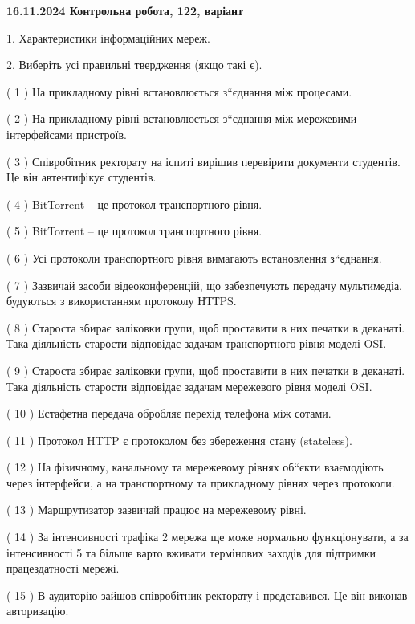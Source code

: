 \documentclass[12pt, ukrainian]{article}
\begin{document}
\vspace{4mm}
\newpage
\begin {large}

\textbf{16.11.2024 Контрольна робота, 122, варіант  }\par


{
1. Характеристики інформаційних мереж.



\vspace{5mm}
2. Виберіть усі правильні твердження (якщо такі є).\par
\vspace{2mm}

( 1 ) На прикладному рівні встановлюється з“єднання між процесами.

( 2 ) На прикладному рівні встановлюється з“єднання між мережевими інтерфейсами пристроїв.

( 3 ) Співробітник ректорату на іспиті вирішив перевірити документи студентів. Це він автентифікує студентів.

( 4 ) BitTorrent – це протокол транспортного рівня.

( 5 ) BitTorrent – це протокол транспортного рівня.

( 6 ) Усі протоколи транспортного рівня вимагають встановлення з“єднання.

( 7 ) Зазвичай засоби відеоконференцій, що забезпечують передачу мультимедіа, будуються з використанням протоколу НТТPS.

( 8 ) Староста збирає заліковки групи, щоб проставити в них печатки в деканаті. Така діяльність старости відповідає задачам транспортного рівня моделі OSI.

( 9 ) Староста збирає заліковки групи, щоб проставити в них печатки в деканаті. Така діяльність старости відповідає задачам мережевого рівня моделі OSI.

( 10 ) Естафетна передача обробляє перехід телефона між сотами.

( 11 ) Протокол  HTTP є протоколом без збереження стану (stateless).

( 12 ) На фізичному, канальному та мережевому рівнях об“єкти взаємодіють через інтерфейси, а на транспортному та прикладному рівнях через протоколи.

( 13 ) Маршрутизатор зазвичай працює на мережевому рівні.

( 14 ) За інтенсивності трафіка 2 мережа ще може нормально функціонувати, а за інтенсивності 5 та більше варто вживати термінових заходів для підтримки працездатності мережі.

( 15 ) В аудиторію зайшов співробітник ректорату і представився. Це він виконав авторизацію.
}
\end {large}
\end{document}
